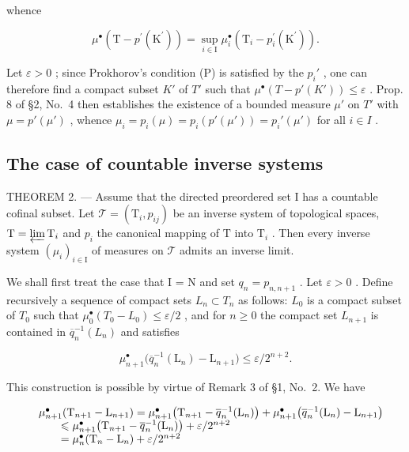 whence

\[
\mu^ {\bullet} \left(\mathrm{T} - p ^ {\prime} \left(\mathrm{K} ^ {\prime}\right)\right) = \sup _ {i \in \mathrm{I}} \mu_ {i} ^ {\bullet} \left(\mathrm{T} _ {i} - p _ {i} ^ {\prime} \left(\mathrm{K} ^ {\prime}\right)\right).
\]

Let \(\varepsilon > 0\) ; since Prokhorov's condition (P) is satisfied by the \(p_i'\) , one can therefore find a compact subset \(K'\) of \(T'\) such that \(\mu^\bullet(T - p'(K')) \leqslant \varepsilon\) . Prop. 8 of §2, No.~4 then establishes the existence of a bounded measure \(\mu'\) on \(T'\) with \(\mu = p'(\mu')\) , whence \(\mu_i = p_i(\mu) = p_i(p'(\mu')) = p_i'(\mu')\) for all \(i \in I\) .

\subsection{The case of countable inverse systems}

THEOREM 2. --- Assume that the directed preordered set I has a countable cofinal subset. Let \(\mathcal{T} = (\mathrm{T}_i, p_{ij})\) be an inverse system of topological spaces, \(\mathrm{T} = \varprojlim \mathrm{T}_i\) and \(p_i\) the canonical mapping of \(\mathrm{T}\) into \(\mathrm{T}_i\) . Then every inverse system \((\mu_i)_{i \in \mathrm{I}}\) of measures on \(\mathcal{T}\) admits an inverse limit.

We shall first treat the case that I = N and set \(q_{n} = p_{n,n+1}\) . Let \(\varepsilon > 0\) . Define recursively a sequence of compact sets \(L_{n} \subset T_{n}\) as follows: \(L_{0}\) is a compact subset of \(T_{0}\) such that \(\mu_{0}^{\bullet}(T_{0} - L_{0}) \leqslant \varepsilon / 2\) , and for \(n \geqslant 0\) the compact set \(L_{n+1}\) is contained in \(\overline{q}_{n}^{-1}(L_{n})\) and satisfies

\[
\mu_ {n + 1} ^ {\bullet} \big (\overline{q}_{n}^{-1} (\mathrm{L} _ {n}) - \mathrm{L} _ {n + 1} \big) \leqslant \varepsilon / 2 ^ {n + 2}.
\]

This construction is possible by virtue of Remark 3 of §1, No.~2. We have

\[
\begin{array}{r l} & {\mu_ {n + 1} ^ {\bullet} (\mathrm{T} _ {n + 1} - \mathrm{L} _ {n + 1}) = \mu_ {n + 1} ^ {\bullet} \big (\mathrm{T} _ {n + 1} - \overline{q}_{n}^{-1} (\mathrm{L} _ {n}) \big) + \mu_ {n + 1} ^ {\bullet} \big (\overline{q}_{n}^{-1} (\mathrm{L} _ {n}) - \mathrm{L} _ {n + 1} \big)} \\ & {\qquad \leqslant \mu_ {n + 1} ^ {\bullet} \big (\mathrm{T} _ {n + 1} - \overline{q}_{n}^{-1} (\mathrm{L} _ {n}) \big) + \varepsilon / 2 ^ {n + 2}} \\ & {\qquad = \mu_ {n} ^ {\bullet} (\mathrm{T} _ {n} - \mathrm{L} _ {n}) + \varepsilon / 2 ^ {n + 2}} \end{array}
\]

